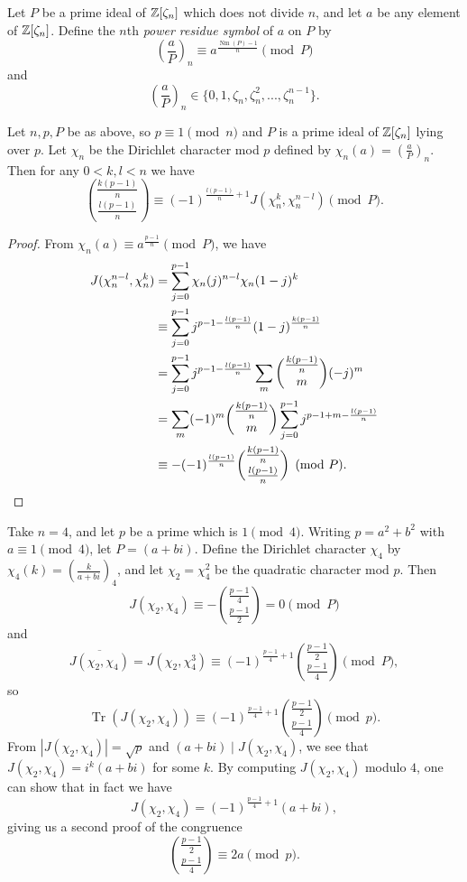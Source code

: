 \documentclass[letterpaper,11pt]{article}
\DeclareMathOperator{\Nm}{Nm}
\DeclareMathOperator{\Tr}{Tr}
\begin{document}
\begin{defn} Let $P$ be a prime ideal of $\mathbb{Z}[\zeta_n]$ which does not divide $n$, and let $a$ be any element of $\mathbb{Z}[\zeta_n]$. Define the $n$th \emph{power residue symbol} of $a$ on $P$ by
\[
\left(\frac{a}{P}\right)_n \equiv a^{\frac{\Nm(P)-1}{n}} \pmod{P}
\]
and
\[
\left(\frac{a}{P}\right)_n \in \{0, 1, \zeta_n, \zeta_n^2, ..., \zeta_n^{n-1}\}.
\]
\end{defn}

\begin{thm} Let $n,p,P$ be as above, so $p \equiv 1 \pmod{n}$ and $P$ is a prime ideal of $\mathbb{Z}[\zeta_n]$ lying over $p$. Let $\chi_n$ be the Dirichlet character mod $p$ defined by $\chi_n(a) = (\frac{a}{P})_n$. Then for any $0 < k,l < n$ we have
\[
\binom{\frac{k(p-1)}{n}}{\frac{l(p-1)}{n}} \equiv (-1)^{\frac{l(p-1)}{n}+1}J(\chi_n^k,\chi_n^{n-l}) \pmod{P}.
\]
\end{thm}
\begin{proof} From $\chi_n(a) \equiv a^{\frac{p-1}{n}} \pmod{P}$, we have
\begin{align*}
J(\chi_n^{n-l},\chi_n^k) &= \sum_{j=0}^{p-1} \chi_n(j)^{n-l}\chi_n(1-j)^k\\
&\equiv \sum_{j=0}^{p-1} j^{p-1-\frac{l(p-1)}{n}}(1-j)^{\frac{k(p-1)}{n}}\\
&= \sum_{j=0}^{p-1} j^{p-1-\frac{l(p-1)}{n}} \sum_m \binom{\frac{k(p-1)}{n}}{m}(-j)^m\\
&= \sum_m (-1)^m\binom{\frac{k(p-1)}{n}}{m} \sum_{j=0}^{p-1} j^{p-1+m-\frac{l(p-1)}{n}}\\
&\equiv -(-1)^{\frac{l(p-1)}{n}}\binom{\frac{k(p-1)}{n}}{\frac{l(p-1)}{n}}\pmod{P}.\qedhere
\end{align*}
\end{proof}

\begin{ex} Take $n = 4$, and let $p$ be a prime which is $1 \pmod{4}$. Writing $p = a^2+b^2$ with $a \equiv 1 \pmod{4}$, let $P = (a+bi)$. Define the Dirichlet character $\chi_4$ by $\chi_4(k) = (\frac{k}{a+bi})_4$, and let $\chi_2 = \chi_4^2$ be the quadratic character mod $p$. Then
\[
J(\chi_2,\chi_4) \equiv -\binom{\frac{p-1}{4}}{\frac{p-1}{2}} = 0 \pmod{P}
\]
and
\[
\overline{J(\chi_2,\chi_4)} = J(\chi_2,\chi_4^3) \equiv (-1)^{\frac{p-1}{4}+1}\binom{\frac{p-1}{2}}{\frac{p-1}{4}} \pmod{P},
\]
so
\[
\Tr(J(\chi_2,\chi_4)) \equiv (-1)^{\frac{p-1}{4}+1}\binom{\frac{p-1}{2}}{\frac{p-1}{4}} \pmod{p}.
\]
From $|J(\chi_2,\chi_4)| = \sqrt{p}$ and $(a+bi) \mid J(\chi_2,\chi_4)$, we see that $J(\chi_2,\chi_4) = i^k(a+bi)$ for some $k$. By computing $J(\chi_2,\chi_4)$ modulo $4$, one can show that in fact we have
\[
J(\chi_2,\chi_4) = (-1)^{\frac{p-1}{4}+1}(a+bi),
\]
giving us a second proof of the congruence
\[
\binom{\frac{p-1}{2}}{\frac{p-1}{4}} \equiv 2a \pmod{p}.
\]
\end{ex}
\end{document}
